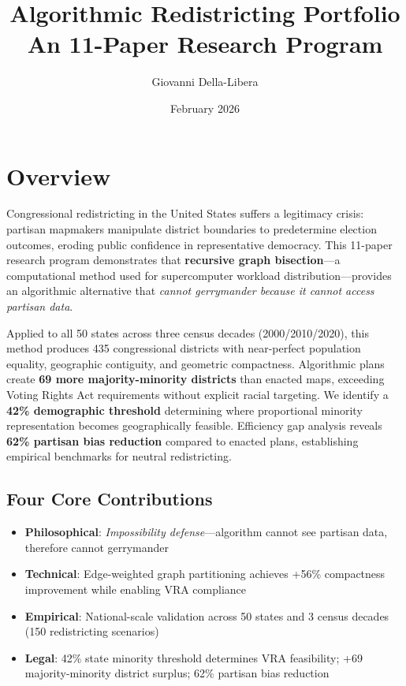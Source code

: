 \documentclass[11pt]{article}
\title{\textbf{Algorithmic Redistricting Portfolio}\\
\large An 11-Paper Research Program}
\author{Giovanni Della-Libera}
\date{February 2026}
\begin{document}
\maketitle

\section*{Overview}

Congressional redistricting in the United States suffers a legitimacy crisis: partisan mapmakers manipulate district boundaries to predetermine election outcomes, eroding public confidence in representative democracy. This 11-paper research program demonstrates that \textbf{recursive graph bisection}---a computational method used for supercomputer workload distribution---provides an algorithmic alternative that \emph{cannot gerrymander because it cannot access partisan data}.

Applied to all 50 states across three census decades (2000/2010/2020), this method produces 435 congressional districts with near-perfect population equality, geographic contiguity, and geometric compactness. Algorithmic plans create \textbf{69 more majority-minority districts} than enacted maps, exceeding Voting Rights Act requirements without explicit racial targeting. We identify a \textbf{42\% demographic threshold} determining where proportional minority representation becomes geographically feasible. Efficiency gap analysis reveals \textbf{62\% partisan bias reduction} compared to enacted plans, establishing empirical benchmarks for neutral redistricting.

\subsection*{Four Core Contributions}

\begin{itemize}[leftmargin=*,noitemsep,topsep=4pt]
    \item \textbf{Philosophical}: \emph{Impossibility defense}---algorithm cannot see partisan data, therefore cannot gerrymander
    \item \textbf{Technical}: Edge-weighted graph partitioning achieves +56\% compactness improvement while enabling VRA compliance
    \item \textbf{Empirical}: National-scale validation across 50 states and 3 census decades (150 redistricting scenarios)
    \item \textbf{Legal}: 42\% state minority threshold determines VRA feasibility; +69 majority-minority district surplus; 62\% partisan bias reduction
\end{itemize}
\end{document}
